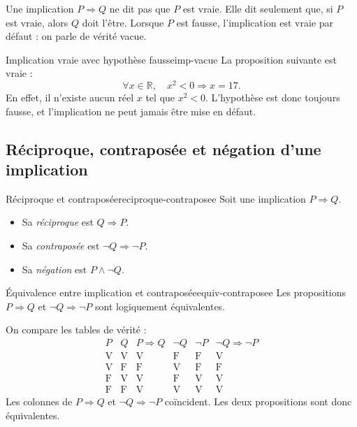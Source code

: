 \documentclass[11pt,a4paper]{article}
\newcommand{\V}{\mathrm{V}}
\newcommand{\F}{\mathrm{F}}
\newcommand{\R}{\mathbb{R}}
\begin{document}
\begin{retenirbox}
Une implication $P\Rightarrow Q$ ne dit pas que $P$ est vraie. Elle dit seulement que, si $P$ est vraie, alors $Q$ doit l'être. Lorsque $P$ est fausse, l'implication est vraie par défaut : on parle de vérité vacue.
\end{retenirbox}

\begin{exemplebox}{Implication vraie avec hypothèse fausse}{imp-vacue}
La proposition suivante est vraie :
\[
\forall x\in\R,\quad x^2<0 \Rightarrow x=17.
\]
En effet, il n'existe aucun réel $x$ tel que $x^2<0$. L'hypothèse est donc toujours fausse, et l'implication ne peut jamais être mise en défaut.
\end{exemplebox}

\subsection{Réciproque, contraposée et négation d'une implication}

\begin{definitionbox}{Réciproque et contraposée}{reciproque-contraposee}
Soit une implication $P\Rightarrow Q$.
\begin{itemize}
  \item Sa \emph{réciproque} est $Q\Rightarrow P$.
  \item Sa \emph{contraposée} est $\neg Q\Rightarrow \neg P$.
  \item Sa \emph{négation} est $P\land \neg Q$.
\end{itemize}
\end{definitionbox}

\begin{propositionbox}{Équivalence entre implication et contraposée}{equiv-contraposee}
Les propositions $P\Rightarrow Q$ et $\neg Q\Rightarrow\neg P$ sont logiquement équivalentes.
\end{propositionbox}

\begin{preuvebox}
On compare les tables de vérité :
\[
\begin{array}{c|c|c|c|c|c}
P&Q&P\Rightarrow Q&\neg Q&\neg P& \neg Q\Rightarrow\neg P\\
\hline
\V&\V&\V&\F&\F&\V\\
\V&\F&\F&\V&\F&\F\\
\F&\V&\V&\F&\V&\V\\
\F&\F&\V&\V&\V&\V
\end{array}
\]
Les colonnes de $P\Rightarrow Q$ et $\neg Q\Rightarrow\neg P$ coïncident. Les deux propositions sont donc équivalentes.
\end{preuvebox}
\end{document}
